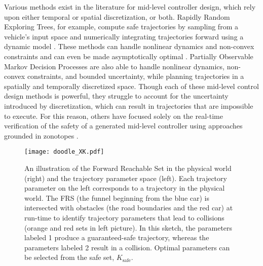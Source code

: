 Various methods exist in the literature for mid-level controller design, which rely upon either temporal or spatial discretization, or both.
Rapidly Random Exploring Trees, for example, compute safe trajectories by sampling from a vehicle's input space and numerically integrating trajectories forward using a dynamic model \cite{lavalle2001randomized}. 
These methods can handle nonlinear dynamics and non-convex constraints and can even be made asymptotically optimal \cite{karaman2011sampling}.
Partially Observable Markov Decision Processes are also able to handle nonlinear dynamics, non-convex constraints, and bounded uncertainty, while planning trajectories in a spatially and temporally discretized space\cite{brechtel2014probabilistic}. 
Though each of these mid-level control design methods is powerful, they struggle to account for the uncertainty introduced by discretization, which can result in trajectories that are impossible to execute.
For this reason, others have focused solely on the real-time verification of the safety of a generated mid-level controller using approaches grounded in zonotopes \cite{althoff2014online}.

\begin{figure}
\texttt{[image: doodle\_XK.pdf]}
\caption{An illustration of the Forward Reachable Set in the physical world (right) and the trajectory parameter space (left). 
Each trajectory parameter on the left corresponds to a trajectory in the physical world. 
The FRS (the funnel beginning from the blue car) is intersected with obstacles (the road boundaries and the red car) at run-time to identify trajectory parameters that lead to collisions (orange and red sets in left picture). 
In this sketch, the parameters labeled 1 produce a guaranteed-safe trajectory, whereas the parameters labeled 2 result in a collision.
Optimal parameters can be selected from the safe set, $K_\text{safe}$.}
\label{fig:overallsketch}
\end{figure}

